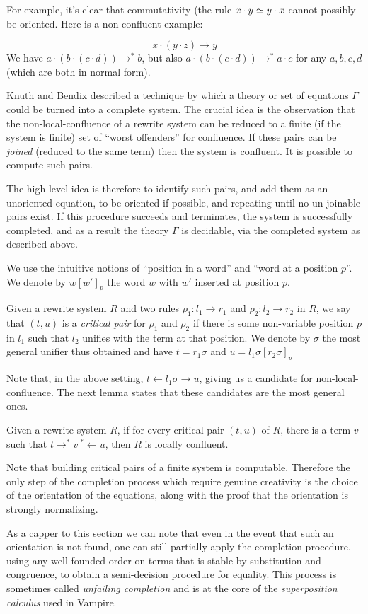 For example, it's clear that commutativity (the rule $x\cdot y\simeq y\cdot x$ cannot possibly be oriented. Here is a non-confluent example:

\[ x \cdot (y \cdot z) \rightarrow y \]
We have $a\cdot (b \cdot (c \cdot d)) \rightarrow^* b$, but also $a\cdot (b\cdot (c\cdot d))\rightarrow^* a\cdot c$ for any $a, b, c, d$ (which are both in normal form).

Knuth and Bendix \cite{knuth-bendix} described a technique by which a theory or set of equations $\Gamma$ could be turned into a complete system. The crucial idea is the observation that the non-local-confluence of a rewrite system can be reduced to a finite (if the system is finite) set of ``worst offenders'' for confluence. If these pairs can be \emph{joined} (reduced to the same term) then the system is confluent. It is possible to compute such pairs.

The high-level idea is therefore to identify such pairs, and add them as an unoriented equation, to be oriented if possible, and repeating until no un-joinable pairs exist. If this procedure succeeds and terminates, the system is successfully completed, and as a result the theory $\Gamma$ is decidable, via the completed system as described above.

We use the intuitive notions of ``position in a word'' and ``word at a position $p$''. We denote by $w[w']_p$ the word $w$ with $w'$ inserted at position $p$.

\begin{definition}
  Given a rewrite system $R$ and two rules $\rho_1: l_1\rightarrow r_1$ and $\rho_2: l_2\rightarrow r_2$ in $R$, we say that $(t, u)$ is a \emph{critical pair} for $\rho_1$ and $\rho_2$ if there is some non-variable position $p$ in $l_1$ such that $l_2$ unifies with the term at that position. We denote by $\sigma$ the most general unifier thus obtained and have $t = r_1\sigma$ and $u = l_1\sigma[r_2\sigma]_p$
\end{definition}

Note that, in the above setting, $t\leftarrow l_1\sigma\rightarrow u$, giving us a candidate for non-local-confluence. The next lemma states that these candidates are the most general ones.

\begin{theorem}
  Given a rewrite system $R$, if for every critical pair $(t, u)$ of $R$, there is a term $v$ such that $t\rightarrow^* v\ {}^*\leftarrow u$, then $R$ is locally confluent.
\end{theorem}

Note that building critical pairs of a finite system is computable. Therefore the only step of the completion process which require genuine creativity is the choice of the orientation of the equations, along with the proof that the orientation is strongly normalizing.

As a capper to this section we can note that even in the event that such an orientation is not found, one can still partially apply the completion procedure, using any well-founded order on terms that is stable by substitution and congruence, to obtain a semi-decision procedure for equality. This process is sometimes called \emph{unfailing completion} and is at the core of the \emph{superposition calculus} used in Vampire.
